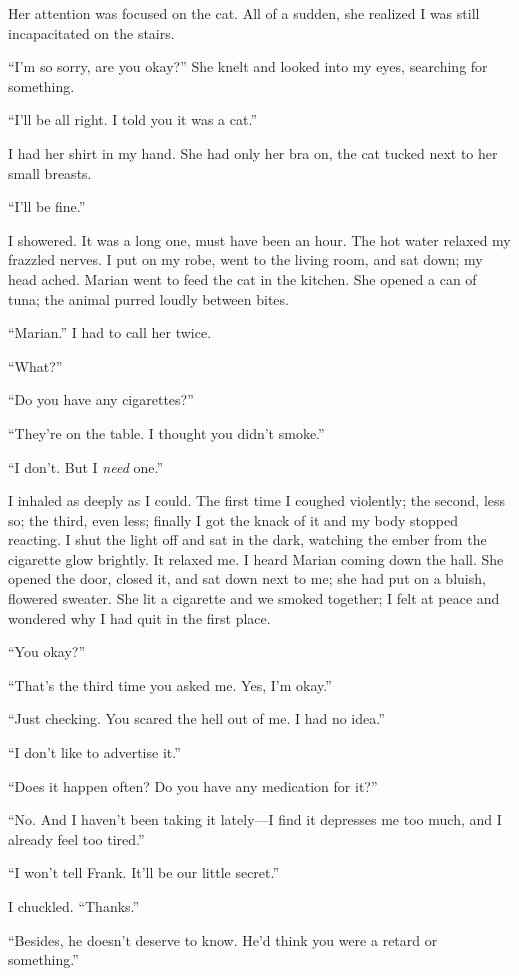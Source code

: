 Her attention was focused on the cat. All of a sudden, she realized I
was still incapacitated on the stairs.

``I'm so sorry, are you okay?'' She knelt and looked into my eyes,
searching for something.

``I'll be all right. I told you it was a cat.''

I had her shirt in my hand. She had only her bra on, the cat tucked next
to her small breasts.

``I'll be fine.''

I showered. It was a long one, must have been an hour. The hot water
relaxed my frazzled nerves. I put on my robe, went to the living room,
and sat down; my head ached. Marian went to feed the cat in the kitchen.
She opened a can of tuna; the animal purred loudly between bites.

``Marian.'' I had to call her twice.

``What?''

``Do you have any cigarettes?''

``They're on the table. I thought you didn't smoke.''

``I don't. But I \emph{need} one.''

I inhaled as deeply as I could. The first time I coughed violently; the
second, less so; the third, even less; finally I got the knack of it and
my body stopped reacting. I shut the light off and sat in the dark,
watching the ember from the cigarette glow brightly. It relaxed me. I
heard Marian coming down the hall. She opened the door, closed it, and
sat down next to me; she had put on a bluish, flowered sweater. She lit
a cigarette and we smoked together; I felt at peace and wondered why I
had quit in the first place.

``You okay?''

``That's the third time you asked me. Yes, I'm okay.''

``Just checking. You scared the hell out of me. I had no idea.''

``I don't like to advertise it.''

``Does it happen often? Do you have any medication for it?''

``No. And I haven't been taking it lately---I find it depresses me too
much, and I already feel too tired.''

``I won't tell Frank. It'll be our little secret.''

I chuckled. ``Thanks.''

``Besides, he doesn't deserve to know. He'd think you were a retard or
something.''

